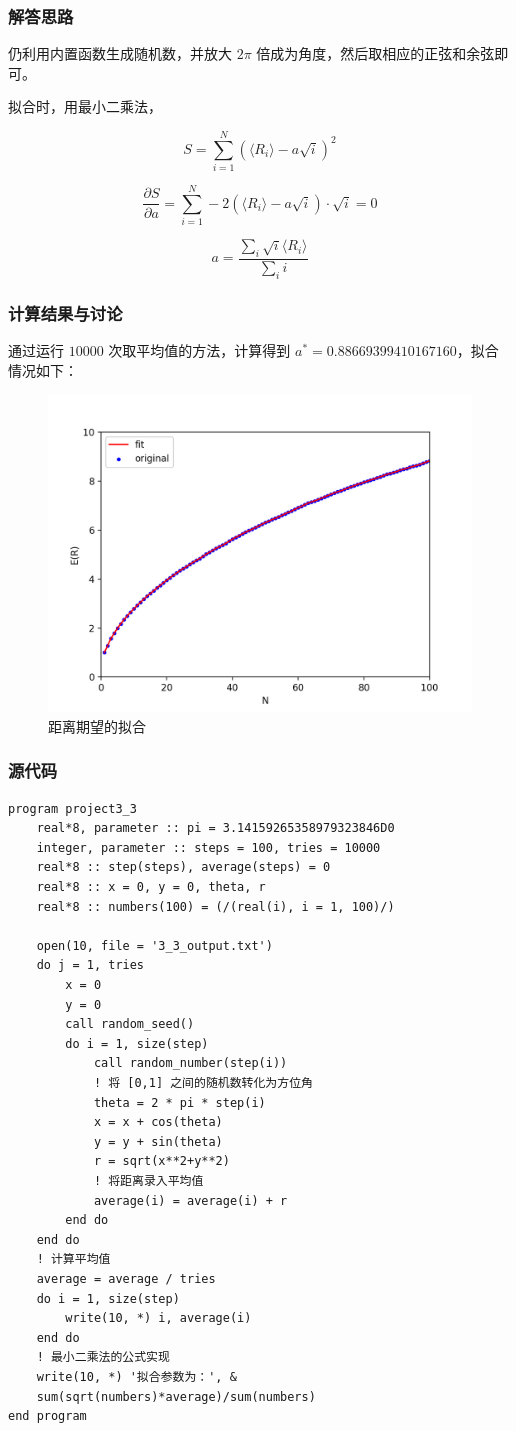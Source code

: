 \documentclass{ctexart}
\begin{document}
\subsubsection{解答思路}

仍利用内置函数生成随机数，并放大 $2\pi$ 倍成为角度，然后取相应的正弦和余弦即可。

拟合时，用最小二乘法，

$$
S=\sum_{i=1}^N\left(\langle R_i\rangle-a\sqrt i\right)^2
$$

$$
\frac{\partial S}{\partial a}=\sum_{i=1}^N-2\left(\langle R_i\rangle-a\sqrt i\right)\cdot\sqrt i=0
$$

$$
a=\frac{\sum_i\sqrt i\langle R_i\rangle}{\sum_i i}
$$

\subsubsection{计算结果与讨论}
通过运行 $10000$ 次取平均值的方法，计算得到 $a^* = 0.88669399410167160$，拟合情况如下：

\begin{figure}[h]
\centering
\includegraphics[scale = 0.5]{fit.png}
\caption{距离期望的拟合}
\end{figure}
\subsubsection{源代码}
\begin{lstlisting}
program project3_3
	real*8, parameter :: pi = 3.14159265358979323846D0
	integer, parameter :: steps = 100, tries = 10000
	real*8 :: step(steps), average(steps) = 0
	real*8 :: x = 0, y = 0, theta, r
	real*8 :: numbers(100) = (/(real(i), i = 1, 100)/)

	open(10, file = '3_3_output.txt')
	do j = 1, tries
		x = 0
		y = 0
		call random_seed()
		do i = 1, size(step)
			call random_number(step(i))
			! 将 [0,1] 之间的随机数转化为方位角
			theta = 2 * pi * step(i)
			x = x + cos(theta)
			y = y + sin(theta)
			r = sqrt(x**2+y**2)
			! 将距离录入平均值
			average(i) = average(i) + r
		end do
	end do
	! 计算平均值
	average = average / tries
	do i = 1, size(step)
		write(10, *) i, average(i)
	end do
	! 最小二乘法的公式实现
	write(10, *) '拟合参数为：', &
	sum(sqrt(numbers)*average)/sum(numbers)
end program
\end{lstlisting}
\end{document}
